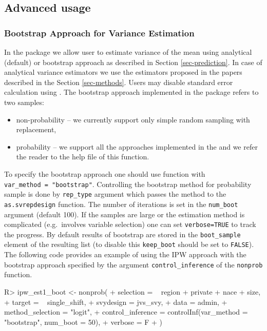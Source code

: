 \documentclass[
]{jss}
\begin{document}
\subsection{Advanced usage}\label{advanced-usage}

\subsubsection{Bootstrap Approach for Variance
Estimation}\label{bootstrap-approach-for-variance-estimation}

In the package we allow user to estimate variance of the mean using
analytical (default) or bootstrap approach as described in Section
\ref{sec-prediction}. In case of analytical variance estimators we use
the estimators proposed in the papers described in the Section
\ref{sec-methods}. Users may disable standard error calculation using
. The bootstrap approach implemented in the
package refers to two samples:

\begin{itemize}
\item non-probability -- we currently support only simple random sampling with replacement,
\item probability -- we support all the approaches implemented in the  and we refer the reader to the help file of this function. 
\end{itemize}

To specify the bootstrap approach one should use 
function with \texttt{var\_method\ =\ "bootstrap"}. Controlling the
bootstrap method for probability sample is done by \texttt{rep\_type}
argument which passes the method to the \texttt{as.svrepdesign}
function. The number of iterations is set in the \texttt{num\_boot}
argument (default 100). If the samples are large or the estimation
method is complicated (e.g.~involves variable selection) one can set
\texttt{verbose=TRUE} to track the progress. By default results of
bootstrap are stored in the \texttt{boot\_sample} element of the
resulting list (to disable this \texttt{keep\_boot} should be set to
\texttt{FALSE}). The following code provides an example of using the IPW
approach with the bootstrap approach specified by the argument
\texttt{control\_inference} of the \texttt{nonprob} function.

\begin{CodeChunk}
\begin{CodeInput}
R> ipw_est1_boot <- nonprob(
+   selection = ~ region + private + nace + size,
+   target = ~ single_shift,
+   svydesign = jvs_svy,
+   data = admin,
+   method_selection = "logit",
+   control_inference = controlInf(var_method = "bootstrap", num_boot = 50),
+   verbose = F
+ )
\end{CodeInput}
\end{CodeChunk}
\end{document}
